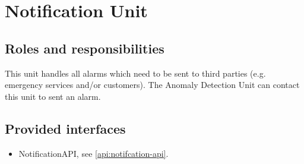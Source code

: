 \section{Notification Unit}
\label{element:notification-unit}

\subsection{Roles and responsibilities}

\npar This unit handles all alarms which need to be sent to third parties (e.g.
emergency services and/or customers). The Anomaly Detection Unit can contact
this unit to sent an alarm.

\subsection{Provided interfaces}

\begin{itemize}
  \item NotificationAPI, see \ref{api:notifcation-api}.
\end{itemize}



